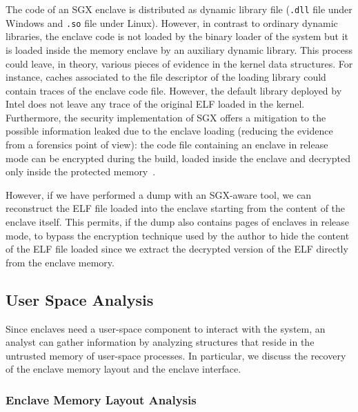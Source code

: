 The code of an SGX enclave is distributed as dynamic library file (\texttt{.dll}
file under Windows and \texttt{.so} file under Linux). However, in contrast to
ordinary dynamic libraries, the enclave code is not loaded by the binary loader 
of the
system but it is loaded inside the memory enclave by an auxiliary dynamic
library. This process could leave,
in theory, various pieces of evidence in the kernel data structures.
For instance, caches
associated to the file descriptor of the loading library could contain traces of
the enclave code file.
However, the default library deployed
by Intel does not leave any trace of the original ELF loaded in the
kernel.
Furthermore, the security implementation of SGX offers a mitigation to the
possible information leaked due to the enclave loading 
(reducing the evidence from a forensics point of view): the code file containing
an enclave in release mode can be encrypted during the build, loaded inside the
enclave and decrypted only inside the protected memory~\citep{sgx-cypher}. 

However, if we have performed a dump with an SGX-aware tool, we can reconstruct
the ELF file loaded into the enclave starting from the content of the enclave
itself. This permits, if the dump also contains pages of enclaves in release
mode, to bypass the encryption technique used by the author to hide the content
of the ELF file loaded  since we extract the decrypted version of the ELF
directly from the enclave memory.

\subsection{User Space Analysis}
\label{ssec:user-space-analyses}

Since enclaves need a user-space component to interact with the system,
an analyst can gather information by analyzing structures that reside 
in the untrusted memory of user-space processes.
In particular, we discuss the recovery of the enclave memory layout and the 
enclave interface.

\subsubsection{Enclave Memory Layout Analysis}

